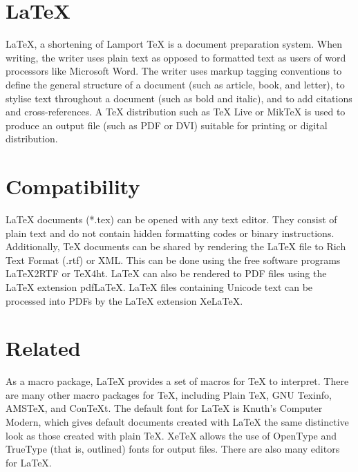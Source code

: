 \documentclass[12pt]{article}
\begin{document}
\section{LaTeX}
\LaTeX{}, a shortening of Lamport \TeX{} is a document preparation
system. When writing, the writer uses plain text as opposed to
formatted text as users of word processors like Microsoft Word. The
writer uses markup tagging conventions to define the general structure
of a document (such as article, book, and letter), to stylise text
throughout a document (such as bold and italic), and to add citations
and cross-references. A \TeX{} distribution such as \TeX{} Live or
MikTeX is used to produce an output file (such as PDF or DVI) suitable
for printing or digital distribution.

\section{Compatibility}
\LaTeX{} documents (*.tex) can be opened with any text editor. They
consist of plain text and do not contain hidden formatting codes or
binary instructions. Additionally, \TeX{} documents can be shared by
rendering the \LaTeX{} file to Rich Text Format (.rtf) or XML. This can
be done using the free software programs LaTeX2RTF or TeX4ht. \LaTeX{}
can also be rendered to PDF files using the \LaTeX{} extension pdfLaTeX.
\LaTeX{} files containing Unicode text can be processed into PDFs by the
\LaTeX{} extension XeLaTeX.

\section{Related}
As a macro package, \LaTeX{} provides a set of macros for \TeX{} to
interpret. There are many other macro packages for \TeX{}, including
Plain \TeX{}, GNU Texinfo, AMSTeX, and ConTeXt. The default font for
\LaTeX{} is Knuth's Computer Modern, which gives default documents
created with \LaTeX{} the same distinctive look as those created with
plain \TeX{}. XeTeX allows the use of OpenType and TrueType (that is,
outlined) fonts for output files. There are also many editors for
\LaTeX{}.
\end{document}
